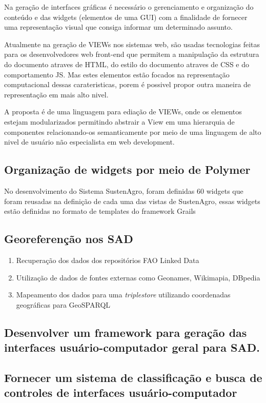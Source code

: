 Na geração de interfaces gráficas é necessário o gerenciamento e organização
do conteúdo e das widgets (elementos de uma GUI) com a finalidade
de fornecer uma representação visual que consiga informar um determinado
assunto.

Atualmente na geração de VIEWs nos sistemas web, são usadas tecnologias
feitas para os desenvolvedores web front-end que permitem a manipulação
da estrutura do documento atraves de HTML, do estilo do documento
atraves de CSS e do comportamento JS. Mas estes elementos estão focados
na representação computacional dessas carateristicas, porem é possivel
propor outra maneira de representação em mais alto nivel.

A proposta é de uma linguagem para ediação de VIEWs, onde os elementos
estejam modularizados permitindo abstrair a View em uma hierarquia
de componentes relacionando-os semanticamente por meio de uma linguagem
de alto nivel de usuário não especialista em web development.

\subsection{Organização de widgets por meio de Polymer}

No desenvolvimento do Sistema SustenAgro, foram definidas 60 widgets
que foram reusadas na definição de cada uma das vistas de SustenAgro,
essas widgets estão definidas no formato de templates do framework
Grails

\subsection{Georeferenção nos SAD}
\begin{enumerate}
\item Recuperação dos dados dos repositórios FAO Linked Data 
\item Utilização de dados de fontes externas como Geonames, Wikimapia, DBpedia
\item Mapeamento dos dados para uma \textit{triplestore} utilizando coordenadas
geográficas para GeoSPARQL 
\end{enumerate}

\subsection{Desenvolver um framework para geração das interfaces usuário-computador
geral para SAD. }

\subsection{Fornecer um sistema de classificação e busca de controles de interfaces
usuário-computador}

